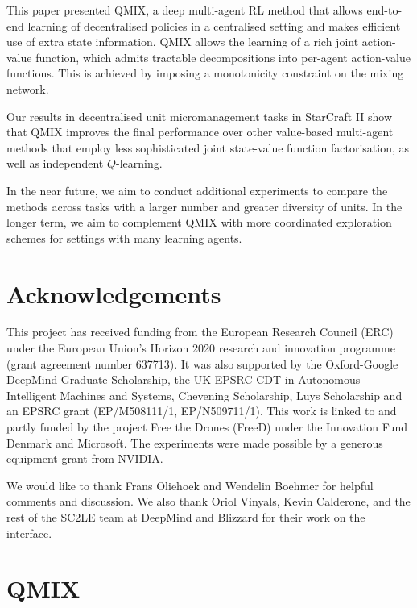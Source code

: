 \documentclass{article}
\begin{document}
This paper presented QMIX, a deep multi-agent RL method that allows end-to-end learning of decentralised policies in a centralised setting and makes efficient use of extra state information. QMIX allows the learning of a rich joint action-value function, which admits tractable decompositions into per-agent action-value functions. This is achieved by imposing a monotonicity constraint on the mixing network.

Our results in decentralised unit micromanagement tasks in StarCraft II show that QMIX improves the final performance over other value-based multi-agent methods that employ less sophisticated joint state-value function factorisation, as well as independent $Q$-learning. 

In the near future, we aim to conduct additional experiments to compare the methods across tasks with a larger number and greater diversity of units. In the longer term, we aim to complement QMIX with more coordinated exploration schemes for settings with many learning agents. 
\section*{Acknowledgements} 

This project has received funding from the European Research Council (ERC) under the European Union's Horizon 2020 research and innovation programme (grant agreement number 637713). 
It was also supported by the Oxford-Google DeepMind Graduate Scholarship, the UK EPSRC CDT in Autonomous Intelligent Machines and Systems, Chevening Scholarship, Luys Scholarship and an EPSRC grant (EP/M508111/1, EP/N509711/1). This work is linked to and partly funded by the project Free the Drones (FreeD) under the Innovation Fund Denmark and Microsoft. The experiments were made possible by a generous equipment grant from NVIDIA.

We would like to thank Frans Oliehoek and Wendelin Boehmer for helpful comments and discussion. 
We also thank Oriol Vinyals, Kevin Calderone, and the rest of the SC2LE team at DeepMind and Blizzard for their work on the interface.

 






\onecolumn
\newpage
\appendix
\section{QMIX}
\end{document}
